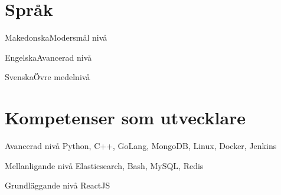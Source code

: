 \documentclass{tccv}
\begin{document}
\section{Språk}

\begin{factlist}
\item{Makedonska}{Modersmål nivå}
\item{Engelska}{Avancerad nivå}
\item{Svenska}{Övre medelnivå}
\end{factlist}

\section{Kompetenser som utvecklare}

\begin{factlist}

\item{Avancerad nivå}
     {Python, C++, GoLang, MongoDB, Linux, Docker, Jenkins}

\item{Mellanligande nivå}
     {Elasticsearch, Bash, MySQL, Redis}

\item{Grundläggande nivå}
     {ReactJS}

\end{factlist}
\end{document}
